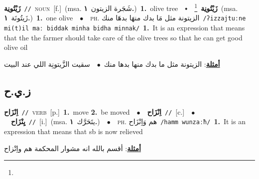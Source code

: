 \documentclass[10pt,a4paper,twoside]{article} %
\begin{document}
\begin{multicols}{2}
{\setlength\topsep{0pt}\textbf{\foreignlanguage{arabic}{زَيْتُونِة}}\ {\color{gray}\texttt{//}\color{black}}\ \textsc{noun}\ [f.]\ \color{gray}(msa. \foreignlanguage{arabic}{شَجَرة الزيتون}~\foreignlanguage{arabic}{\textbf{١.}})\color{black}\ \textbf{1.}~olive tree\ \ $\smblkdiamond$\ \ \setlength\topsep{0pt}\textbf{\foreignlanguage{arabic}{زَيْتُونِة}}\ \footnote{}\ \color{gray}(msa. \foreignlanguage{arabic}{زَيتُونَة}~\foreignlanguage{arabic}{\textbf{١.}})\color{black}\ \textbf{1.}~one olive\ \ $\bullet$\ \ \textsc{ph.} \color{gray} \foreignlanguage{arabic}{الزيتونة مثل مَا بدك منهَا بدهَا منك}\color{black}\ {\color{gray}\texttt{/{\sffamily ʔizzajtuːne mi(t)il maː biddak minha bidha minnak}/}\color{black}}\ \textbf{1.}~It is an expression that means that the the farmer should take care of the olive trees so that he can get good olive oil\  \begin{flushright}\color{gray}\foreignlanguage{arabic}{\textbf{\underline{\foreignlanguage{arabic}{أمثلة}}}: الزيتونة مثل ما بدك منها بدها منك\ $\bullet$\ \  سقيت الزَّيتونِة اللي عند البيت}\end{flushright}\color{black}} \vspace{2mm}

\vspace{-3mm}
\subsection*{\color{blue}\foreignlanguage{arabic}{ز.ي.ح}\color{blue}{}} 

{\setlength\topsep{0pt}\textbf{\foreignlanguage{arabic}{اِنْزَاح}}\ {\color{gray}\texttt{//}\color{black}}\ \textsc{verb}\ [p.]\ \textbf{1.}~move  \textbf{2.}~be moved\ \ $\bullet$\ \ \setlength\topsep{0pt}\textbf{\foreignlanguage{arabic}{اِنْزَاح}}\ {\color{gray}\texttt{//}\color{black}}\ [c.]\ \ $\bullet$\ \ \setlength\topsep{0pt}\textbf{\foreignlanguage{arabic}{يِنْزَاح}}\ {\color{gray}\texttt{//}\color{black}}\ [i.]\ \color{gray}(msa. \foreignlanguage{arabic}{يتَحَرَّك}~\foreignlanguage{arabic}{\textbf{١.}})\color{black}\ \ $\bullet$\ \ \textsc{ph.} \color{gray} \foreignlanguage{arabic}{هم وَاِنْزَاح}\color{black}\ {\color{gray}\texttt{/{\sffamily hamm wunzaːħ}/}\color{black}}\ \textbf{1.}~It is an expression that means that sb is now relieved\  \begin{flushright}\color{gray}\foreignlanguage{arabic}{\textbf{\underline{\foreignlanguage{arabic}{أمثلة}}}: أقسم بالله انه مشوار المحكمة هم واِنْزاح}\end{flushright}\color{black}} \vspace{2mm}


\end{multicols}
\end{document}
